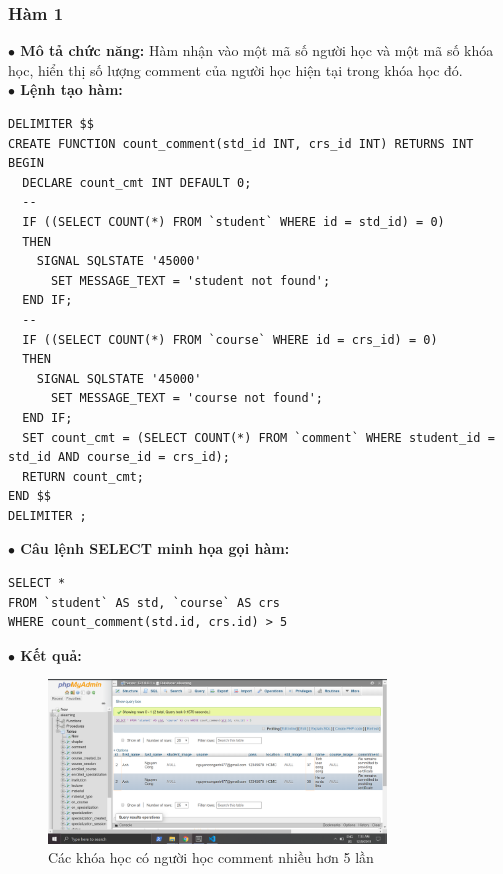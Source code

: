 \documentclass[12pt,a4paper,titlepage]{article}
\begin{document}
\subsubsection{Hàm 1}
\textbf{$\bullet$ Mô tả chức năng:} Hàm nhận vào một mã số người học và một mã số khóa học, hiển thị số lượng comment của người học hiện tại trong khóa học đó.\\
\textbf{$\bullet$ Lệnh tạo hàm:}
\begin{lstlisting}
DELIMITER $$
CREATE FUNCTION count_comment(std_id INT, crs_id INT) RETURNS INT
BEGIN
  DECLARE count_cmt INT DEFAULT 0;
  --
  IF ((SELECT COUNT(*) FROM `student` WHERE id = std_id) = 0)
  THEN
    SIGNAL SQLSTATE '45000'
	  SET MESSAGE_TEXT = 'student not found';
  END IF;
  --
  IF ((SELECT COUNT(*) FROM `course` WHERE id = crs_id) = 0)
  THEN
    SIGNAL SQLSTATE '45000'
	  SET MESSAGE_TEXT = 'course not found';
  END IF;
  SET count_cmt = (SELECT COUNT(*) FROM `comment` WHERE student_id = std_id AND course_id = crs_id);
  RETURN count_cmt;
END $$
DELIMITER ;
\end{lstlisting}
\textbf{$\bullet$ Câu lệnh SELECT minh họa gọi hàm:}
\begin{lstlisting}
SELECT *
FROM `student` AS std, `course` AS crs
WHERE count_comment(std.id, crs.id) > 5
\end{lstlisting}
\textbf{$\bullet$ Kết quả:}
\begin{figure}[h!]
	\centering
	\caption{Các khóa học có người học comment nhiều hơn 5 lần}
	\includegraphics[width=0.8\textwidth]{images/cmmt7.png}
\end{figure}
\end{document}
